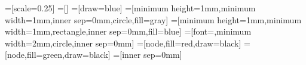 =[scale=0.25]
=[]
=[draw=blue]
=[minimum height=1mm,minimum width=1mm,inner sep=0mm,circle,fill=gray]
=[minimum height=1mm,minimum width=1mm,rectangle,inner sep=0mm,fill=blue]
=[font=\tiny,minimum width=2mm,circle,inner sep=0mm]
=[node,fill=red,draw=black]
=[node,fill=green,draw=black]
=[inner sep=0mm]

